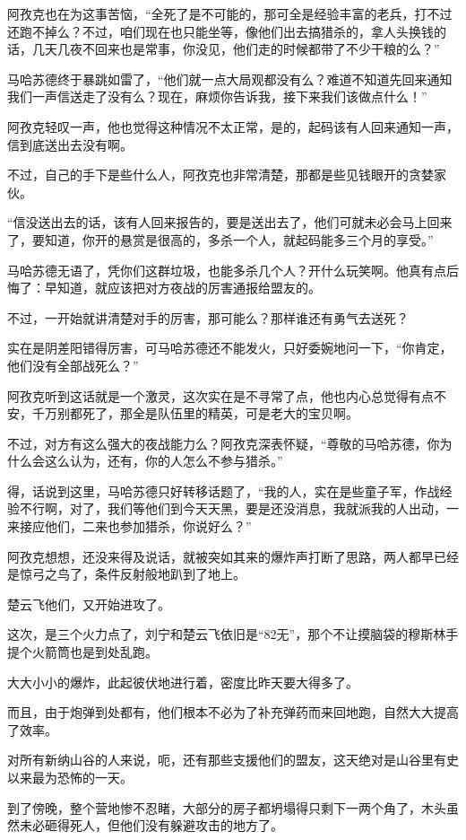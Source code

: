 阿孜克也在为这事苦恼，“全死了是不可能的，那可全是经验丰富的老兵，打不过还跑不掉么？不过，咱们现在也只能坐等，像他们出去搞猎杀的，拿人头换钱的话，几天几夜不回来也是常事，你没见，他们走的时候都带了不少干粮的么？”

马哈苏德终于暴跳如雷了，“他们就一点大局观都没有么？难道不知道先回来通知我们一声信送走了没有么？现在，麻烦你告诉我，接下来我们该做点什么！”

阿孜克轻叹一声，他也觉得这种情况不太正常，是的，起码该有人回来通知一声，信到底送出去没有啊。

不过，自己的手下是些什么人，阿孜克也非常清楚，那都是些见钱眼开的贪婪家伙。

“信没送出去的话，该有人回来报告的，要是送出去了，他们可就未必会马上回来了，要知道，你开的悬赏是很高的，多杀一个人，就起码能多三个月的享受。”

马哈苏德无语了，凭你们这群垃圾，也能多杀几个人？开什么玩笑啊。他真有点后悔了：早知道，就应该把对方夜战的厉害通报给盟友的。

不过，一开始就讲清楚对手的厉害，那可能么？那样谁还有勇气去送死？

实在是阴差阳错得厉害，可马哈苏德还不能发火，只好委婉地问一下，“你肯定，他们没有全部战死么？”

阿孜克听到这话就是一个激灵，这次实在是不寻常了点，他也内心总觉得有点不安，千万别都死了，那全是队伍里的精英，可是老大的宝贝啊。

不过，对方有这么强大的夜战能力么？阿孜克深表怀疑，“尊敬的马哈苏德，你为什么会这么认为，还有，你的人怎么不参与猎杀。”

得，话说到这里，马哈苏德只好转移话题了，“我的人，实在是些童子军，作战经验不行啊，对了，我们等他们到今天天黑，要是还没消息，我就派我的人出动，一来接应他们，二来也参加猎杀，你说好么？”

阿孜克想想，还没来得及说话，就被突如其来的爆炸声打断了思路，两人都早已经是惊弓之鸟了，条件反射般地趴到了地上。

楚云飞他们，又开始进攻了。

这次，是三个火力点了，刘宁和楚云飞依旧是“82无”，那个不让摸脑袋的穆斯林手提个火箭筒也是到处乱跑。

大大小小的爆炸，此起彼伏地进行着，密度比昨天要大得多了。

而且，由于炮弹到处都有，他们根本不必为了补充弹药而来回地跑，自然大大提高了效率。

对所有新纳山谷的人来说，呃，还有那些支援他们的盟友，这天绝对是山谷里有史以来最为恐怖的一天。

到了傍晚，整个营地惨不忍睹，大部分的房子都坍塌得只剩下一两个角了，木头虽然未必砸得死人，但他们没有躲避攻击的地方了。

